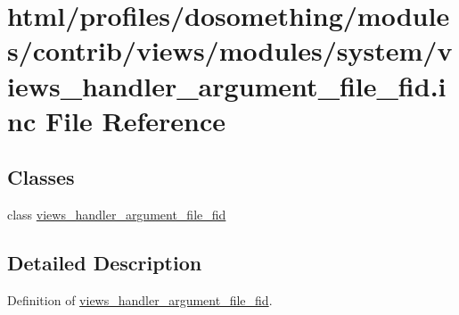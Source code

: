 \hypertarget{views__handler__argument__file__fid_8inc}{
\section{html/profiles/dosomething/modules/contrib/views/modules/system/views\_\-handler\_\-argument\_\-file\_\-fid.inc File Reference}
\label{views__handler__argument__file__fid_8inc}
}
\subsection*{Classes}
\begin{DoxyCompactItemize}
\item 
class \hyperlink{classviews__handler__argument__file__fid}{views\_\-handler\_\-argument\_\-file\_\-fid}
\end{DoxyCompactItemize}


\subsection{Detailed Description}
Definition of \hyperlink{classviews__handler__argument__file__fid}{views\_\-handler\_\-argument\_\-file\_\-fid}. 